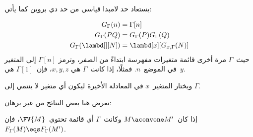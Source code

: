 \documentclass[../../../include/open-logic-section]{subfiles}
\begin{document}
يستعاد حد لامبدا قياسي من حد دي بروين كما يأتي:

\begin{defn}
  \begin{align*}
    G_\Gamma(n) &= \Gamma[n] \\
    G_\Gamma(PQ) &= G_\Gamma(P) G_\Gamma(Q) \\
    G_\Gamma(\lambd[][N]) &= \lambd[x][G_{x,\Gamma}(N)]
  \end{align*}
  حيث~$\Gamma$ مرة أخرى قائمة متغيرات مفهرسة ابتداءً من الصفر، وترمز
  $\Gamma[n]$ إلى المتغير في الموضع~$n$. فمثلًا، إذا كانت~$\Gamma$ هي
  $x,y,z$، فإن~$\Gamma[1]$ هي~$y$.

  ويختار المتغير~$x$ في المعادلة الأخيرة ليكون أي متغير لا ينتمي إلى
  $\Gamma$.
\end{defn}

نعرض هنا بعض النتائج من غير برهان:

\begin{prop}
  إذا كان~$M \aconvone M'$ وكانت~$\Gamma$ أي قائمة تحتوي~$\FV{M}$، فإن
  $F_\Gamma(M) \eqs F_\Gamma(M')$.
\end{prop}
\end{document}
